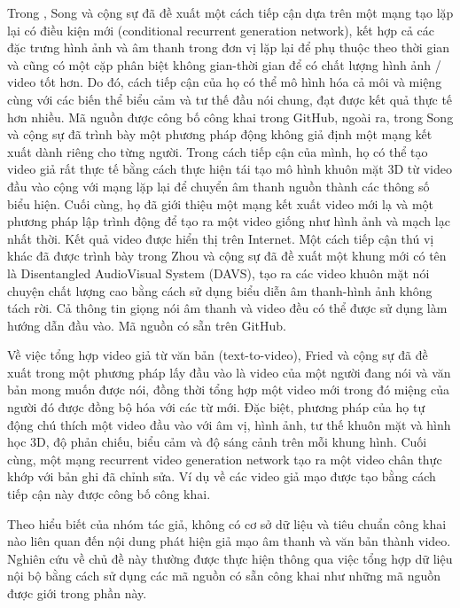\documentclass{article}
\begin{document}
Trong , Song và cộng sự đã đề xuất một cách tiếp cận dựa trên một mạng tạo lặp lại có điều kiện mới (conditional recurrent generation network), kết hợp cả các đặc trưng hình ảnh và âm thanh trong đơn vị lặp lại để phụ thuộc theo thời gian và cũng có một cặp phân biệt không gian-thời gian để có chất lượng hình ảnh / video tốt hơn. Do đó, cách tiếp cận của họ có thể mô hình hóa cả môi và miệng cùng với các biến thể biểu cảm và tư thế đầu nói chung, đạt được kết quả thực tế hơn nhiều. Mã nguồn được công bố công khai trong GitHub, ngoài ra, trong  Song và cộng sự đã trình bày một phương pháp động không giả định một mạng kết xuất dành riêng cho từng người. Trong cách tiếp cận của mình, họ có thể tạo video giả rất thực tế bằng cách thực hiện tái tạo mô hình khuôn mặt 3D từ video đầu vào cộng với mạng lặp lại để chuyển âm thanh nguồn thành các thông số biểu hiện. Cuối cùng, họ đã giới thiệu một mạng kết xuất video mới lạ và một phương pháp lập trình động để tạo ra một video giống như hình ảnh và mạch lạc nhất thời. Kết quả video được hiển thị trên Internet. Một cách tiếp cận thú vị khác đã được trình bày trong  Zhou và cộng sự đã đề xuất một khung mới có tên là Disentangled AudioVisual System (DAVS), tạo ra các video khuôn mặt nói chuyện chất lượng cao bằng cách sử dụng biểu diễn âm thanh-hình ảnh không tách rời. Cả thông tin giọng nói âm thanh và video đều có thể được sử dụng làm hướng dẫn đầu vào. Mã nguồn có sẵn trên GitHub.

Về việc tổng hợp video giả từ văn bản (text-to-video), Fried và cộng sự đã đề xuất trong  một phương pháp lấy đầu vào là video của một người đang nói và văn bản mong muốn được nói, đồng thời tổng hợp một video mới trong đó miệng của người đó được đồng bộ hóa với các từ mới. Đặc biệt, phương pháp của họ tự động chú thích một video đầu vào với âm vị, hình ảnh, tư thế khuôn mặt và hình học 3D, độ phản chiếu, biểu cảm và độ sáng cảnh trên mỗi khung hình. Cuối cùng, một mạng recurrent video generation network tạo ra một video chân thực khớp với bản ghi đã chỉnh sửa. Ví dụ về các video giả mạo được tạo bằng cách tiếp cận này được công bố công khai.

Theo hiểu biết của nhóm tác giả, không có cơ sở dữ liệu và tiêu chuẩn công khai nào liên quan đến nội dung phát hiện giả mạo âm thanh và văn bản thành video. Nghiên cứu về chủ đề này thường được thực hiện thông qua việc tổng hợp dữ liệu nội bộ bằng cách sử dụng các mã nguồn có sẵn công khai như những mã nguồn được giới trong phần này.
\end{document}
